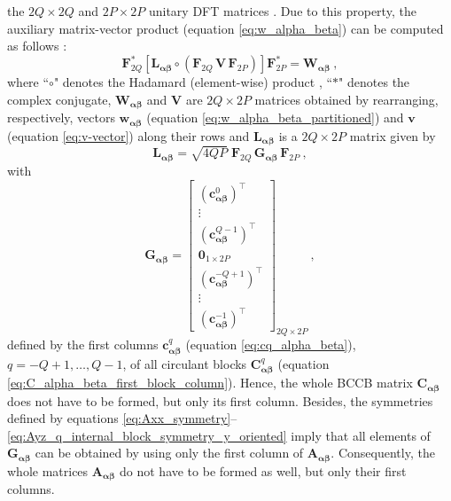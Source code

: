 \documentclass[manuscript]{geophysics}
\begin{document}
	the $2Q \times 2Q$ and $2P \times 2P$ unitary DFT matrices \citep[][ p. 31]{davis1979}.
	Due to this property, the auxiliary matrix-vector product (equation \ref{eq:w_alpha_beta}) 
	can be computed as follows \citep{takahashi2020convolutional}:
	\begin{equation}
		\mathbf{F}_{2Q}^{\ast} \left[ 
		\mathbf{L}_{\boldsymbol{\alpha\beta}} \circ \left(\mathbf{F}_{2Q} \, \mathbf{V} \, \mathbf{F}_{2P} \right) 
		\right] \mathbf{F}_{2P}^{\ast} = \mathbf{W}_{\boldsymbol{\alpha\beta}} \: ,
		\label{eq:2d-discrete-convolution}
	\end{equation}
	where ``$\circ$" denotes the Hadamard (element-wise) product \citep[e.g.,][ p. 298]{horn_johnson1991},
	``$\ast$" denotes the complex conjugate, 
	$\mathbf{W}_{\boldsymbol{\alpha\beta}}$ and $\mathbf{V}$ are $2Q \times 2P$ matrices obtained
	by rearranging, respectively, vectors $\mathbf{w}_{\boldsymbol{\alpha\beta}}$ 
	(equation \ref{eq:w_alpha_beta_partitioned}) and $\mathbf{v}$ (equation \ref{eq:v-vector})
	along their rows and $\mathbf{L}_{\boldsymbol{\alpha\beta}}$ is a $2Q \times 2P$ matrix
	given by
	\begin{equation}
		\mathbf{L}_{\boldsymbol{\alpha\beta}} = \sqrt{4QP} \; 
		\mathbf{F}_{2Q} \, \mathbf{G}_{\boldsymbol{\alpha\beta}} \, \mathbf{F}_{2P} \: ,
		\label{eq:L_alpha_beta}
	\end{equation}
	with
	\begin{equation}
		\mathbf{G}_{\boldsymbol{\alpha\beta}} = \begin{bmatrix}
			\left( \mathbf{c}_{\boldsymbol{\alpha\beta}}^{0} \right)^{\top} \\
			\vdots \\
			\left( \mathbf{c}_{\boldsymbol{\alpha\beta}}^{Q-1} \right)^{\top} \\
			\mathbf{0}_{1 \times 2P} \\
			\left( \mathbf{c}_{\boldsymbol{\alpha\beta}}^{-Q+1} \right)^{\top} \\
			\vdots \\
			\left( \mathbf{c}_{\boldsymbol{\alpha\beta}}^{-1} \right)^{\top}
		\end{bmatrix}_{2Q \times 2P} \: ,
		\label{eq:G_alpha_beta}
	\end{equation}
	defined by the first columns $\mathbf{c}_{\boldsymbol{\alpha\beta}}^{q}$ 
	(equation \ref{eq:cq_alpha_beta}), $q = -Q+1, \dots, Q-1$, of all circulant blocks
	$\mathbf{C}_{\boldsymbol{\alpha\beta}}^{q}$ (equation \ref{eq:C_alpha_beta_first_block_column}).
	Hence, the whole BCCB matrix $\mathbf{C}_{\boldsymbol{\alpha\beta}}$ does not have to be
	formed, but only its first column. 
	Besides, the symmetries defined by equations 
	\ref{eq:Axx_symmetry}--\ref{eq:Ayz_q_internal_block_symmetry_y_oriented} imply
	that all elements of $\mathbf{G}_{\boldsymbol{\alpha\beta}}$ can be obtained by 
	using only the first column of $\mathbf{A_{\boldsymbol{\alpha\beta}}}$. Consequently, 
	the whole matrices $\mathbf{A_{\boldsymbol{\alpha\beta}}}$ do not have to be formed
	as well, but only their first columns.
	
\end{document}
